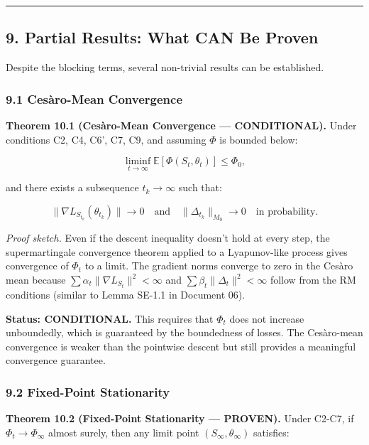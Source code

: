 \documentclass[
  12pt,
]{article}
\begin{document}
\begin{center}\rule{0.5\linewidth}{0.5pt}\end{center}

\subsection{9. Partial Results: What CAN Be
Proven}\label{partial-results-what-can-be-proven}

Despite the blocking terms, several non-trivial results can be
established.

\subsubsection{9.1 Cesàro-Mean
Convergence}\label{cesuxe0ro-mean-convergence}

\textbf{Theorem 10.1 (Cesàro-Mean Convergence --- CONDITIONAL).} Under
conditions C2, C4, C6', C7, C9, and assuming \(\Phi\) is bounded below:

\[\liminf_{t \to \infty} \mathbb{E}[\Phi(S_t, \theta_t)] \leq \Phi_0,\]

and there exists a subsequence \(t_k \to \infty\) such that:

\[\|\nabla L_{S_{t_k}}(\theta_{t_k})\| \to 0 \quad \text{and} \quad \|\Delta_{t_k}\|_{M_0} \to 0 \quad \text{in probability}.\]

\emph{Proof sketch.} Even if the descent inequality doesn't hold at
every step, the supermartingale convergence theorem applied to a
Lyapunov-like process gives convergence of \(\Phi_t\) to a limit. The
gradient norms converge to zero in the Cesàro mean because
\(\sum \alpha_t \|\nabla L_{S_t}\|^2 < \infty\) and
\(\sum \beta_t \|\Delta_t\|^2 < \infty\) follow from the RM conditions
(similar to Lemma SE-1.1 in Document 06).

\textbf{Status: CONDITIONAL.} This requires that \(\Phi_t\) does not
increase unboundedly, which is guaranteed by the boundedness of losses.
The Cesàro-mean convergence is weaker than the pointwise descent but
still provides a meaningful convergence guarantee.

\subsubsection{9.2 Fixed-Point
Stationarity}\label{fixed-point-stationarity}

\textbf{Theorem 10.2 (Fixed-Point Stationarity --- PROVEN).} Under
C2-C7, if \(\Phi_t \to \Phi_\infty\) almost surely, then any limit point
\((S_\infty, \theta_\infty)\) satisfies:
\end{document}
